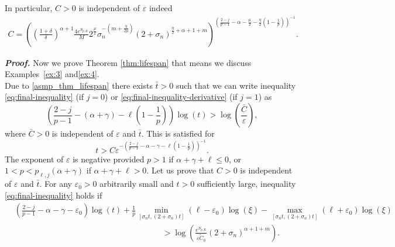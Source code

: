 \documentclass[11pt,reqno]{amsart}
\theoremstyle{definition}
\numberwithin{equation}{section}
\renewenvironment{proof}{\smallskip\noindent\emph{\textbf{Proof.}}%
  \hspace{1pt}}{\hspace{-5pt}{\nobreak\quad\nobreak\hfill\nobreak%
    $\square$\vspace{2pt}\par}\smallskip\goodbreak}
\newcommand{\eps}{\varepsilon}
\begin{document}
In particular, $C>0$ is independent of $\eps$ indeed
%
\begin{align}
C=\left(\left(\frac{1+\delta}{\delta}\right)^{\alpha+1}\frac{4 e^{S_{p,K}}}{M}2^\frac{\mu}{2}\sigma_n^{-(m+\frac{\eta}{2p})}(2+\sigma_n)^{\frac{\eta}{2}+\alpha+1+m}\right)^{\left(\frac{2-j}{p-1}-\alpha-\frac{\mu}{2}-\frac{\eta}{2}\left(1-\frac{1}{p}\right)\right)^{-1}}.
\end{align}

\begin{proof}
Now we prove Theorem \ref{thm:lifespan} that means we discuss Examples~\ref{ex:3} and\ref{ex:4}.\\ 
Due to \eqref{asmp_thm_lifespan} there exists $\bar t>0$ such that  we can write inequality \eqref{eq:final-inequality} (if $j=0$) or \eqref{eq:final-inequality-derivative} (if $j=1$) as
\begin{equation}
\left(\frac{2-j}{p-1}-\left(\alpha+\gamma\right)-\ell\left(1-\frac{1}{p}\right)\right)\log(t)>\log\left(\frac{\bar{C}}{\eps}\right),
\end{equation}
%
where $\bar{C}>0$ is independent of $\eps$ and $\bar t$. This is satisfied for
%
\begin{equation}
\label{eq:lifespan_ex4}
t>C\varepsilon^{-\left(\frac{2-j}{p-1}-\alpha-\gamma-\ell\left(1-\frac{1}{p}\right)\right)^{-1}}.
\end{equation}
%
The exponent of $\eps$ is negative provided $p>1$ if $\alpha+\gamma+\ell\leq 0$, or $1<p<p_{\ell,j}(\alpha+\gamma)$ if $\alpha+\gamma+\ell>0.$ Let us prove that $C>0$ is independent of $\varepsilon$ and $\bar t.$ 
For any $\eps_0>0$ arbitrarily small and $t>0$ sufficiently large, inequality \eqref{eq:final-inequality} holds if
%
\begin{equation}
\label{eq:final_inequality_lifespan_examples2-4}
\begin{aligned}
   &\left(\frac{2-j}{p-1}-\alpha-\gamma-\eps_0\right)\log(t)+\frac{1}{p} \min_{[\sigma_n t,(2+\sigma_n)t]}(\ell-\eps_0)\log(\xi)- \max_{[\sigma_n t,(2+\sigma_n)t]}(\ell+\eps_0)\log(\xi)\\ &\hspace{18em}>\log\left(\frac{e^{S_{p,K}}}{\eps \tilde C_0}\left(2+\sigma_n\right)^{\alpha+1+m}\right).
\end{aligned}
%
\end{equation}
%
%

\end{proof}
\end{document}
